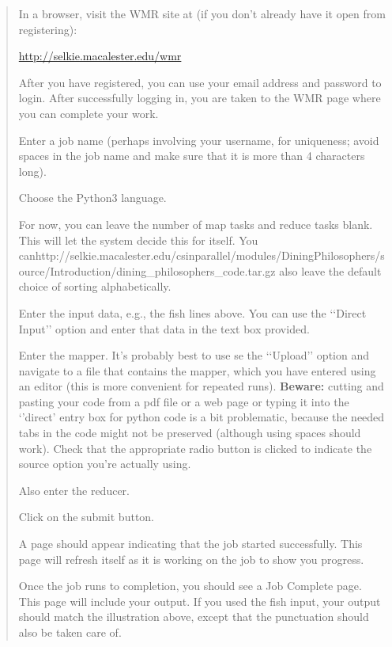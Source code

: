 \documentclass[letterpaper,10pt,openany,oneside]{sphinxmanual}
\begin{document}
\begin{quote}

In a browser, visit the WMR site at (if you don't already have it
open from registering):

\href{http://selkie.macalester.edu/wmr}{http://selkie.macalester.edu/wmr}

After you have registered, you can use your email address and
password to login. After successfully logging in, you are taken to
the WMR page where you can complete your work.

Enter a job name (perhaps involving your username, for uniqueness;
avoid spaces in the job name and make sure that it is more than 4
characters long).

Choose the Python3 language.

For now, you can leave the number of map tasks and reduce tasks
blank. This will let the system decide this for itself. You canhttp://selkie.macalester.edu/csinparallel/modules/DiningPhilosophers/source/Introduction/dining\_philosophers\_code.tar.gz
also leave the default choice of sorting alphabetically.

Enter the input data, e.g., the fish lines above. You can use the
{}`{}`Direct Input'' option and enter that data in the text box
provided.

Enter the mapper. It's probably best to use se the {}`{}`Upload''
option and navigate to a file that contains the mapper, which you
have entered using an editor (this is more convenient for repeated
runs). \textbf{Beware:} cutting and pasting your code from a pdf file or
a web page or typing it into the {}`'direct' entry box for python
code is a bit problematic, because the needed tabs in the code
might not be preserved (although using spaces should work). Check
that the appropriate radio button is clicked to indicate the source
option you're actually using.

Also enter the reducer.

Click on the submit button.

A page should appear indicating that the job started successfully.
This page will refresh itself as it is working on the job to show
you progress.

Once the job runs to completion, you should see a Job Complete page.
This page will include your output. If you used the fish input,
your output should match the illustration above, except that the
punctuation should also be taken care of.
\end{quote}
\end{document}
